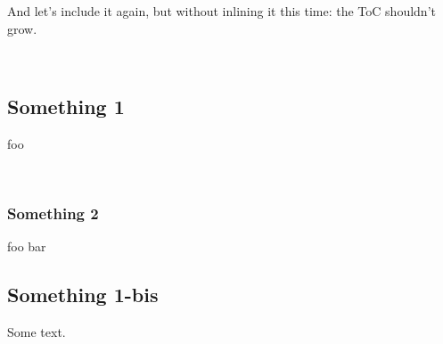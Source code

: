 And let's include it again, but without inlining it this time: the ToC shouldn't grow.

 \hyperref[container-page-test+u+package+++ml-module-Include+u+sections-module-type-Something]{}\label{container-page-test+u+package+++ml-module-Include+u+sections-val-something}\\
\subsection{Something 1\label{something-1}}%
foo

\label{container-page-test+u+package+++ml-module-Include+u+sections-val-foo}\\
\subsubsection{Something 2\label{something-2}}%
\label{container-page-test+u+package+++ml-module-Include+u+sections-val-bar}\begin{ocamlindent}foo bar\end{ocamlindent}%
\medbreak
\subsection{Something 1-bis\label{something-1-bis}}%
Some text.



